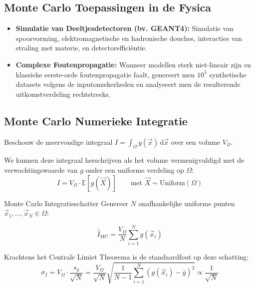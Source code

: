 \documentclass[11pt,a4paper]{article}
\newcommand{\E}{\mathbb{E}}
\newcommand{\dd}{\mathrm{d}}
\begin{document}
\subsection{Monte Carlo Toepassingen in de Fysica}
\begin{itemize}[leftmargin=1.5em]
    \item \textbf{Simulatie van Deeltjesdetectoren (bv. GEANT4):} Simulatie van spoorvorming, elektromagnetische en hadronische douches, interacties van straling met materie, en detectorefficiëntie.
    \item \textbf{Complexe Foutenpropagatie:} Wanneer modellen sterk niet-lineair zijn en klassieke eerste-orde foutenpropagatie faalt, genereert men $10^5$ synthetische datasets volgens de inputonzekerheden en analyseert men de resulterende uitkomstverdeling rechtstreeks.
\end{itemize}

\subsection{Monte Carlo Numerieke Integratie}
Beschouw de meervoudige integraal $I = \int_\Omega g(\vec{x}) \, \dd \vec{x}$ over een volume $V_\Omega$.

We kunnen deze integraal herschrijven als het volume vermenigvuldigd met de verwachtingswaarde van $g$ onder een uniforme verdeling op $\Omega$:
\begin{equation}
    I = V_\Omega \cdot \E[g(\vec{X})] \qquad \text{met } \vec{X} \sim \text{Uniform}(\Omega)
\end{equation}

\begin{defbox}{Monte Carlo Integratieschatter}
Genereer $N$ onafhankelijke uniforme punten $\vec{x}_1, \ldots, \vec{x}_N \in \Omega$:
\begin{formulabox}
\begin{equation}
    \hat{I}_{\text{MC}} = \frac{V_\Omega}{N} \sum_{i=1}^N g(\vec{x}_i)
\end{equation}
\end{formulabox}
Krachtens het Centrale Limiet Theorema is de standaardfout op deze schatting:
\begin{equation}
    \sigma_I = V_\Omega \cdot \frac{s_g}{\sqrt{N}} = \frac{V_\Omega}{\sqrt{N}} \sqrt{\frac{1}{N - 1} \sum_{i=1}^N (g(\vec{x}_i) - \bar{g})^2} \propto \frac{1}{\sqrt{N}}
\end{equation}
\end{defbox}
\end{document}
